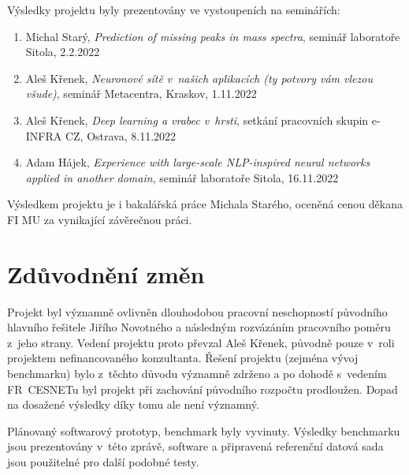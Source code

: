 \documentclass[a4paper,11pt]{article}
\begin{document}




Výsledky projektu byly prezentovány ve vystoupeních na seminářích:
\begin{enumerate}
\item Michal Starý, \emph{Prediction of missing peaks in mass spectra}, seminář laboratoře Sitola, 2.2.2022
\item Aleš Křenek, \emph{Neuronové sítě v~našich aplikacích (ty potvory vám vlezou všude)}, seminář Metacentra, Kraskov, 1.11.2022
\item Aleš Křenek, \emph{Deep learning a vrabec v~hrsti}, setkání pracovních skupin e-INFRA CZ, Ostrava, 8.11.2022
\item Adam Hájek, \emph{Experience with large-scale NLP-inspired neural networks applied in another domain}, seminář laboratoře Sitola, 16.11.2022
\end{enumerate}

Výsledkem projektu je i bakalářská práce Michala Starého, oceněná cenou děkana FI MU za vynikající závěrečnou práci.



\section{Zdůvodnění změn}





Projekt byl významně ovlivněn dlouhodobou pracovní neschopností původního hlavního řešitele
Jiřího Novotného
a následným rozvázáním pracovního poměru z~jeho strany.
Vedení projektu proto převzal Aleš Křenek, původně pouze v~roli projektem nefinancovaného
konzultanta.
Řešení projektu (zejména vývoj benchmarku) bylo z~těchto důvodu významně zdrženo
a po dohodě s~vedením FR~CESNETu byl projekt při zachování původního rozpočtu prodloužen.
Dopad na dosažené výsledky díky tomu ale není významný.

Plánovaný softwarový prototyp, benchmark byly vyvinuty. Výsledky benchmarku jsou prezentovány
v~této zprávě, software a připravená referenční datová sada jsou použitelné pro další podobné testy.
\end{document}
